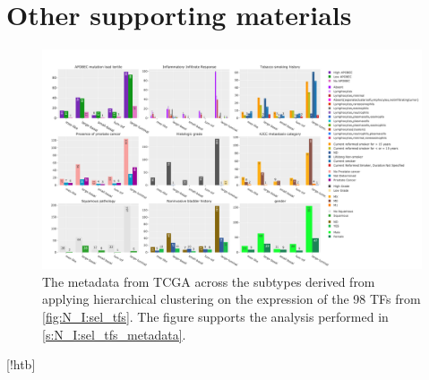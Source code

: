 \section{Other supporting materials}

\begin{figure}
    \centering
    \includegraphics[width=1.0\textwidth,keepaspectratio]{Sections/Network_I/Resources/selective_pruning/sel_tfs/sel_tfs_tcga_meta.png}
      \caption{The metadata from TCGA \cite{Robertson2017-mg} across the subtypes derived from applying hierarchical clustering on the expression of the 98 TFs from \cref{fig:N_I:sel_tfs}. The figure supports the analysis performed in \cref{s:N_I:sel_tfs_metadata}.}
    \label{fig:ap:sel_tfs_tcga_metadata}
\end{figure}[!htb]   


\newpage 





